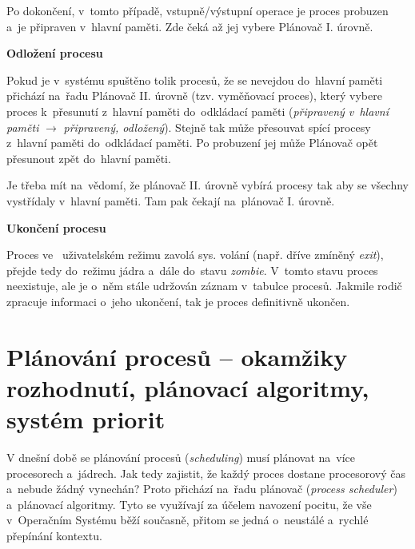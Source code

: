 Po dokončení, v~tomto případě, vstupně/výstupní operace je proces probuzen a~je připraven v~hlavní paměti. Zde čeká až jej vybere Plánovač I. úrovně. 

\begin{large}
    \vspace{0,5cm}
    \textbf{Odložení procesu}
\end{large}

Pokud je v~systému spuštěno tolik procesů, že se nevejdou do~hlavní paměti přichází na~řadu Plánovač II. úrovně (tzv. vyměňovací proces), který vybere proces k~přesunutí z~hlavní paměti do~odkládací paměti (\emph{připravený v~hlavní paměti} $\xrightarrow{}$ \emph{připravený, odložený}). Stejně tak může přesouvat spící procesy z~hlavní paměti do~odkládací paměti. Po probuzení jej může Plánovač opět přesunout zpět do~hlavní paměti.

\vspace{0,5cm}

Je třeba mít na~vědomí, že plánovač II. úrovně vybírá procesy tak aby se všechny vystřídaly v~hlavní paměti. Tam pak čekají na~plánovač I. úrovně. 

\begin{large}
    \vspace{0,5cm}
    \textbf{Ukončení procesu}
\end{large}

Proces ve~ uživatelském režimu zavolá sys. volání (např. dříve zmíněný \emph{exit}), přejde tedy do~režimu jádra a~dále do~stavu \emph{zombie}. V~tomto stavu proces neexistuje, ale je o~něm stále udržován záznam v~tabulce procesů. Jakmile rodič zpracuje informaci o~jeho ukončení, tak je proces definitivně ukončen. 


\clearpage
\section{Plánování procesů -- okamžiky rozhodnutí, plánovací algoritmy, systém priorit} \label{planning}

V dnešní době se plánování procesů (\emph{scheduling}) musí plánovat na~více procesorech a~jádrech. Jak tedy zajistit, že každý proces dostane procesorový čas a~nebude žádný vynechán? Proto přichází na~řadu plánovač (\emph{process scheduler}) a~plánovací algoritmy. Tyto se využívají za účelem navození pocitu, že vše v~Operačním Systému běží současně, přitom se jedná o~neustálé a~rychlé přepínání kontextu.

